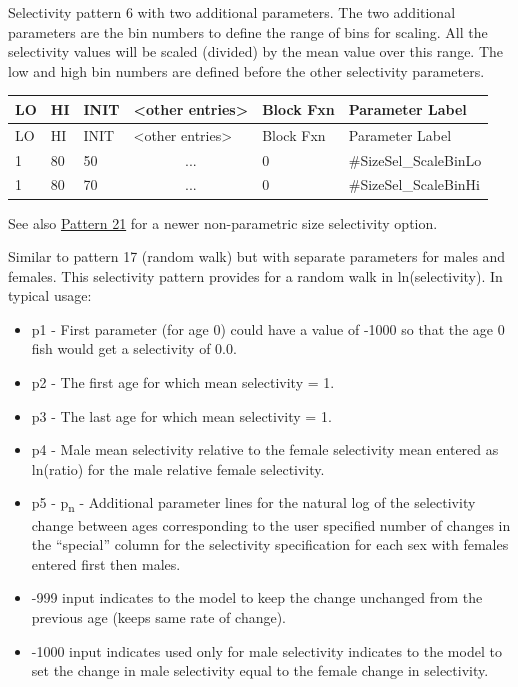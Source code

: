 \hypertarget{NonParamScaling}{}
Selectivity pattern 6 with two additional parameters. The two additional parameters are the bin numbers to define the range of bins for scaling. All the selectivity values will be scaled (divided) by the mean value over this range. The low and high bin numbers are defined before the other selectivity parameters.
	
	\begin{longtable}{p{1cm} p{1cm} p{1cm} p{2.9cm} p{1.9cm} p{4.2cm}}
		\hline
		LO \Tstrut & HI & INIT & <other entries> & Block Fxn & Parameter Label \Bstrut\\
		\hline
		\endfirsthead
	
		\hline
		LO \Tstrut & HI & INIT & <other entries> & Block Fxn & Parameter Label \Bstrut\\
		\hline
		\endhead

		1 & 80 & 50 & \multicolumn{1}{c}{...} & 0 & \#SizeSel\_ScaleBinLo \Tstrut\\
		1 & 80 & 70 & \multicolumn{1}{c}{...} & 0 & \#SizeSel\_ScaleBinHi \Bstrut\\
		\hline
	\end{longtable}

See also \hyperlink{NonParamSelectivity21}{Pattern 21} for a newer non-parametric size selectivity option.

\hypertarget{Pattern44}{}
Similar to pattern 17 (random walk) but with separate parameters for males and females. This selectivity pattern provides for a random walk in ln(selectivity). In typical usage:
	\begin{itemize}
		\item p1 - First parameter (for age 0) could have a value of -1000 so that the age 0 fish would get a selectivity of 0.0.
		\item p2 - The first age for which mean selectivity = 1.
		\item p3 - The last age for which mean selectivity = 1.
		\item p4 - Male mean selectivity relative to the female selectivity mean entered as ln(ratio) for the male relative female selectivity.
		\item p5 - p\textsubscript{n} - Additional parameter lines for the natural log of the selectivity change between ages corresponding to the user specified number of changes in the ``special'' column for the selectivity specification for each sex with females entered first then males.
		\item -999 input indicates to the model to keep the change unchanged from the previous age (keeps same rate of change).
		\item -1000 input indicates used only for male selectivity indicates to the model to set the change in male selectivity equal to the female change in selectivity.
	\end{itemize}
	

